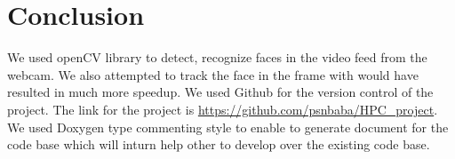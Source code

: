 \documentclass[conference]{IEEEtran}
\begin{document}
%






\section{Conclusion}
We used openCV library to detect, recognize faces in the video feed from the webcam. We also attempted to track the face in the frame with would have resulted in much more speedup. We used Github for the version control of the project. The link for the project is \url{https://github.com/psnbaba/HPC_project}. We used Doxygen type commenting style to enable to generate document for the code base which will inturn help other to develop over the existing code base.
\end{document}
